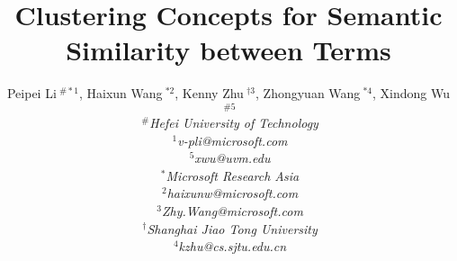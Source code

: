 \documentclass[fleqn]{sig-alternate}
\begin{document}
\title{Clustering Concepts for Semantic Similarity between Terms}
\author{%
{Peipei Li{\small $~^{\#*1}$}, Haixun Wang{\small $~^{*2}$}, Kenny Zhu{\small $~^{\dag3}$}, Zhongyuan Wang{\small $~^{*4}$}, Xindong Wu{\small $~^{\#5}$} } %
\vspace{1.6mm}\\
\fontsize{10}{10}\selectfont\itshape
$~^{\#}$Hefei University of Technology\\
\fontsize{9}{9}\selectfont\ttfamily\upshape
$~^{1}$v-pli@microsoft.com\\
\fontsize{9}{9}\selectfont\ttfamily\upshape
$~^{5}$xwu@uvm.edu
\vspace{1.2mm}\\
\fontsize{10}{10}\selectfont\rmfamily\itshape
$~^{*}$Microsoft Research Asia\\
\fontsize{9}{9}\selectfont\ttfamily\upshape
$~^{2}$haixunw@microsoft.com\\
\fontsize{9}{9}\selectfont\ttfamily\upshape $~^{3}$Zhy.Wang@microsoft.com\\
\fontsize{10}{10}\selectfont\rmfamily\itshape
$~^{\dag}$Shanghai Jiao Tong University\\
\fontsize{9}{9}\selectfont\ttfamily\upshape
$~^{4}$kzhu@cs.sjtu.edu.cn\\
}
\maketitle
\end{document}
